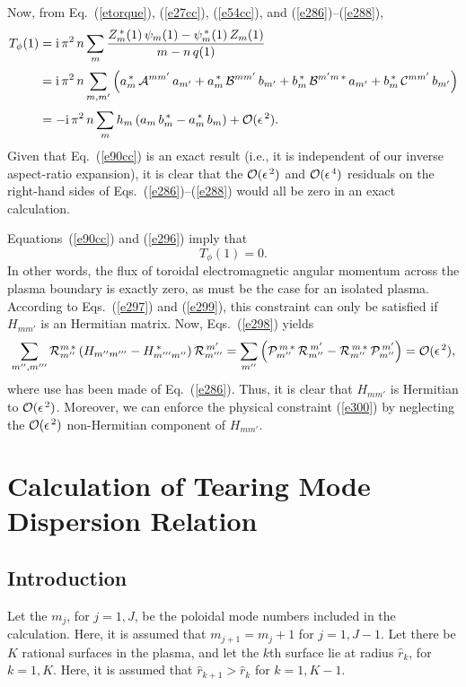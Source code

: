\documentclass[12pt,prb,aps]{revtex4-1}
\begin{document}
Now, from Eq.~(\ref{etorque}), (\ref{e27cc}), (\ref{e54cc}), and (\ref{e286})--(\ref{e288}), 
\begin{align}\label{e299}
T_\phi(1) &= {\rm i}\,\pi^2\,n\sum_{m}\frac{Z_m^{\,\ast}(1)\,\psi_m(1)-\psi_m^{\,\ast}(1)\,Z_m(1)}{m-n\,q(1)}\nonumber\\[0.5ex]
&={\rm i}\,\pi^2\,n\sum_{m,m'}\left(a_m^{\,\ast}\,{\cal A}^{mm'}\,a_{m'} + a_m^{\,\ast}\,{\cal B}^{mm'}\,b_{m'}+b_m^{\,\ast}\,{\cal B}^{m'm\,\ast}\,a_{m'}
+b_m^{\,\ast}\,{\cal C}^{mm'}\,b_{m'}\right)\nonumber\\[0.5ex]
&= -{\rm i}\,\pi^2\,n\sum_m h_m\,(a_m\,b_m^{\,\ast}-a_m^{\,\ast}\,b_m) + {\cal O}(\epsilon^{\,2}).
\end{align}
Given that Eq.~(\ref{e90cc}) is an exact result (i.e., it is independent of our inverse aspect-ratio expansion), it is clear that the 
${\cal O}(\epsilon^{\,2})$ and ${\cal O}(\epsilon^{\,4})$ residuals on the right-hand sides of Eqs.~(\ref{e286})--(\ref{e288})
would all be zero in an exact calculation.

Equations~(\ref{e90cc}) and (\ref{e296}) imply that 
\begin{equation}\label{e300}
T_\phi(1)=0. 
\end{equation}
In other words, the flux of toroidal electromagnetic angular momentum across the plasma boundary is
exactly zero, as must be the case for an isolated plasma.  According to Eqs.~(\ref{e297}) and (\ref{e299}), this constraint can only be satisfied if  $H_{mm'}$ is an Hermitian matrix. 
Now, Eqs.~(\ref{e298}) yields 
\begin{equation}
\sum_{m'',m'''}{\cal R}_{m''}^{m\,\ast}\,(H_{m''m'''}-H_{m'''m''}^{\,\ast})\,{\cal R}_{m'''}^{\,m'}=\sum_{m''}\left({\cal P}_{m''}^{\,m\,\ast}\,{\cal R}_{m''}^{\,m'}- {\cal R}_{m''}^{\,m\,\ast}\,{\cal P}_{m''}^{\,m'}\right)={\cal O}(\epsilon^{\,2}),
\end{equation}
where use has been made of Eq.~(\ref{e286}). Thus, it is clear that $H_{mm'}$ is Hermitian to ${\cal O}(\epsilon^{\,2})$. 
Moreover, we can enforce the physical constraint  (\ref{e300}) by neglecting the ${\cal O}(\epsilon^{\,2})$ non-Hermitian
component of $H_{mm'}$.

\section{Calculation of Tearing Mode Dispersion Relation}
\subsection{Introduction}
Let the $m_j$, for $j=1,J$, be the poloidal mode numbers included in the calculation. Here, it is assumed that $m_{j+1}=m_j+1$ for $j=1,J-1$. 
Let there be $K$ rational surfaces in the plasma, and let the $k$th surface lie at radius $\hat{r}_k$, for $k=1,K$. Here,
it is assumed that $\hat{r}_{k+1}>\hat{r}_k$ for $k=1,K-1$. 
\end{document}
